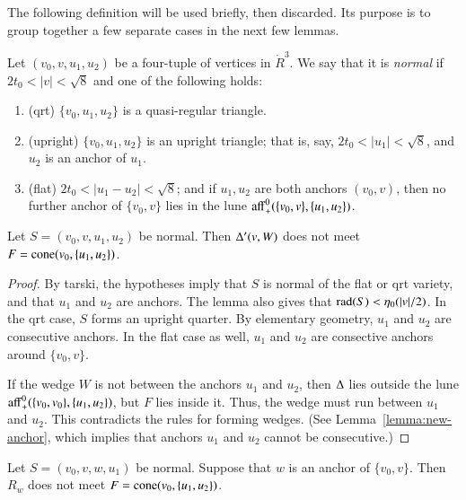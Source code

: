 The following definition will be used briefly, then discarded.
Its purpose is to group together a few separate cases in the next
few lemmas.

\begin{definition}  Let $(v_0,v,u_1,u_2)$ be a four-tuple of vertices
in $\ring{R}^3$.  We say that it is {\it normal} if $2t_0<|v|<\sqrt8$
and one of the
following holds:
\begin{enumerate}
  \item (qrt) $\{v_0,u_1,u_2\}$ is a quasi-regular triangle.
  \item (upright) $\{v_0,u_1,u_2\}$ is an upright triangle; that is, say,
    $2t_0 < |u_1| < \sqrt8$, and $u_2$ is an anchor of $u_1$.
  \item (flat)
   $2t_0<|u_1-u_2|<\sqrt8$; and if $u_1,u_2$ are both anchors $(v_0,v)$, 
   then
    no further anchor of $\{v_0,v\}$
   lies in the lune ${\operatorname{aff}}^0_+(\{v_0,v\},\{u_1,u_2\})$.
\end{enumerate}
\end{definition}

\begin{lemma}\label{lemma:BigD-}  Let $S=(v_0,v,u_1,u_2)$ be normal.
Then
$\Delta'(v,W)$ does not meet $F={\operatorname{cone}}(v_0,\{u_1,u_2\})$.
\end{lemma}

\begin{proof}  By tarski, 
the hypotheses imply
that $S$ is normal of the flat or qrt variety, and 
that $u_1$ and $u_2$ are anchors.  The lemma also
gives that 
$\operatorname{rad}(S)<\eta_0(|v|/2)$.    
In the qrt case, $S$ forms
an upright quarter.  By elementary geometry, $u_1$ and $u_2$
are consecutive anchors. In the flat case as well, 
$u_1$ and $u_2$ are consective
anchors around $\{v_0,v\}$.

If the wedge $W$ is not between
the anchors $u_1$ and $u_2$, then $\Delta$ lies outside the 
lune ${\operatorname{aff}}_+^0(\{v_0,v_0\},\{u_1,u_2\})$, but $F$ lies inside it.  Thus,
the wedge must run between $u_1$ and $u_2$.   This contradicts 
the rules for forming wedges.  (See
Lemma~\ref{lemma:new-anchor}, which implies that
anchors $u_1$ and $u_2$ cannot be consecutive.)
\end{proof}

\begin{lemma}\label{lemma:fine-Rw}
Let $S=(v_0,v,w,u_1)$ be normal.
Suppose that $w$ is an anchor of $\{v_0,v\}$.
Then
$R_w$
does not meet $F={\operatorname{cone}}(v_0,\{u_1,u_2\})$.
\end{lemma}

